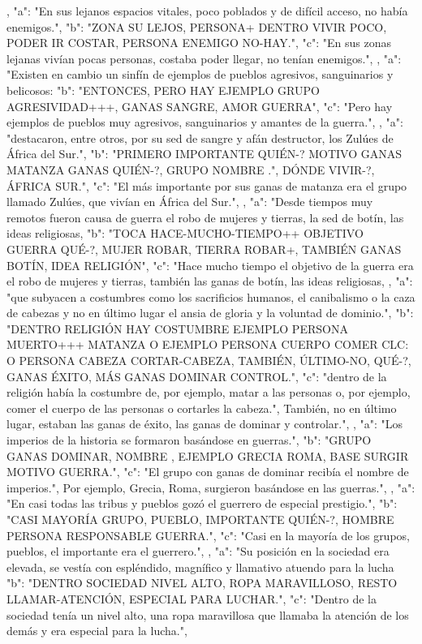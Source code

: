 ,
{
"a": "En sus lejanos espacios vitales, poco poblados y de difícil acceso, no había enemigos.",
"b": "ZONA SU LEJOS, PERSONA+ DENTRO VIVIR POCO, PODER IR COSTAR, PERSONA ENEMIGO NO-HAY.",
"c": "En sus zonas lejanas vivían pocas personas, costaba poder llegar, no tenían enemigos.",
}
,
{
"a": "Existen en cambio un sinfín de ejemplos de pueblos agresivos, sanguinarios y belicosos:
"b": "ENTONCES, PERO HAY EJEMPLO GRUPO AGRESIVIDAD+++, GANAS SANGRE, AMOR GUERRA",
"c": "Pero hay ejemplos de pueblos muy agresivos, sanguinarios y amantes de la guerra.",
}
,
{
"a": "destacaron, entre otros, por su sed de sangre y afán destructor, los Zulúes de África del Sur.",
"b": "PRIMERO IMPORTANTE QUIÉN-? MOTIVO GANAS MATANZA GANAS QUIÉN-?, GRUPO NOMBRE .", DÓNDE VIVIR-?, ÁFRICA SUR.",
"c": "El más importante por sus ganas de matanza era el grupo llamado Zulúes, que vivían en África del Sur.",
}
,
{
"a": "Desde tiempos muy remotos fueron causa de guerra el robo de mujeres y tierras, la sed de botín, las ideas religiosas,
"b": "TOCA HACE-MUCHO-TIEMPO++ OBJETIVO GUERRA QUÉ-?, MUJER ROBAR, TIERRA ROBAR+, TAMBIÉN GANAS BOTÍN, IDEA RELIGIÓN",
"c": "Hace mucho tiempo el objetivo de la guerra era el robo de mujeres y tierras, también las ganas de botín, las ideas religiosas,
}
,
{
"a": "que subyacen a costumbres como los sacrificios humanos, el canibalismo o la caza de cabezas y no en último lugar el ansia de gloria y la voluntad de dominio.",
"b": "DENTRO RELIGIÓN HAY COSTUMBRE EJEMPLO PERSONA MUERTO+++ MATANZA O EJEMPLO PERSONA CUERPO COMER CLC:  O PERSONA CABEZA CORTAR-CABEZA, TAMBIÉN, ÚLTIMO-NO, QUÉ-?, GANAS ÉXITO, MÁS GANAS DOMINAR CONTROL.",
"c": "dentro de la religión había la costumbre de, por ejemplo, matar a las personas o, por ejemplo, comer el cuerpo de las personas o cortarles la cabeza.", También, no en último lugar, estaban las ganas de éxito, las ganas de dominar y controlar.",
}
,
{
"a": "Los imperios de la historia se formaron basándose en guerras.",
"b": "GRUPO GANAS DOMINAR, NOMBRE , EJEMPLO GRECIA ROMA, BASE SURGIR MOTIVO GUERRA.",
"c": "El grupo con ganas de dominar recibía el nombre de imperios.", Por ejemplo, Grecia, Roma, surgieron basándose en las guerras.",
}
,
{
"a": "En casi todas las tribus y pueblos gozó el guerrero de especial prestigio.",
"b": "CASI MAYORÍA GRUPO, PUEBLO, IMPORTANTE QUIÉN-?, HOMBRE PERSONA RESPONSABLE GUERRA.",
"c": "Casi en la mayoría de los grupos, pueblos, el importante era el guerrero.",
}
,
{
"a": "Su posición en la sociedad era elevada, se vestía con espléndido, magnífico y llamativo atuendo para la lucha
"b": "DENTRO SOCIEDAD NIVEL ALTO, ROPA MARAVILLOSO, RESTO LLAMAR-ATENCIÓN, ESPECIAL PARA LUCHAR.",
"c": "Dentro de la sociedad tenía un nivel alto, una ropa maravillosa que llamaba la atención de los demás y era especial para la lucha.",
}
